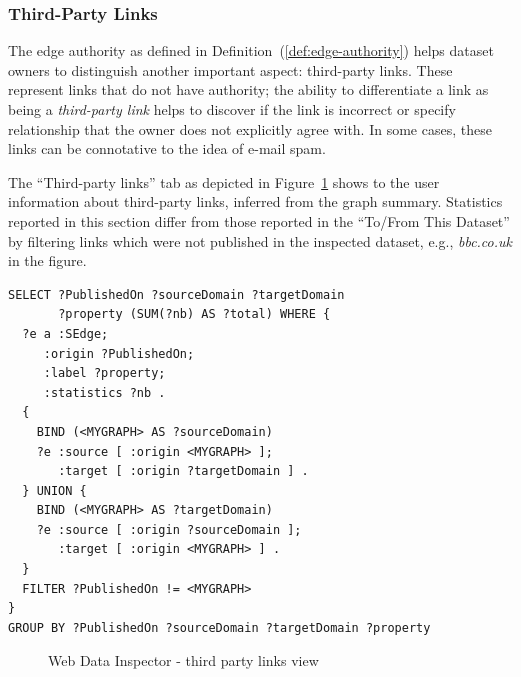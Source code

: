 \subsubsection{Third-Party Links}

The edge authority as defined in Definition~(\ref{def:edge-authority}) helps dataset owners to distinguish another important aspect: third-party links. These represent links that do not have authority; the ability to differentiate a link as being a \emph{third-party link} helps to discover if the link is incorrect or specify relationship that the owner does not explicitly agree with. In some cases, these links can be connotative to the idea of e-mail spam.

The ``Third-party links'' tab as depicted in Figure~\ref{fig:wdi:thirdPartyLinks} shows to the user information about third-party links, inferred from the graph summary.
Statistics reported in this section differ from those reported in the ``To/From This Dataset'' by filtering links which were not published in the inspected dataset, e.g., \emph{bbc.co.uk} in the figure.

\begin{verbatim}
SELECT ?PublishedOn ?sourceDomain ?targetDomain
       ?property (SUM(?nb) AS ?total) WHERE {
  ?e a :SEdge;
     :origin ?PublishedOn;
     :label ?property;
     :statistics ?nb .
  {
    BIND (<MYGRAPH> AS ?sourceDomain)
    ?e :source [ :origin <MYGRAPH> ];
       :target [ :origin ?targetDomain ] .
  } UNION {
    BIND (<MYGRAPH> AS ?targetDomain)
    ?e :source [ :origin ?sourceDomain ];
       :target [ :origin <MYGRAPH> ] .
  }
  FILTER ?PublishedOn != <MYGRAPH>
}
GROUP BY ?PublishedOn ?sourceDomain ?targetDomain ?property
\end{verbatim}

\begin{figure}
	\centering
	\caption{Web Data Inspector - third party links view}
	\label{fig:wdi:thirdPartyLinks}
\end{figure}


